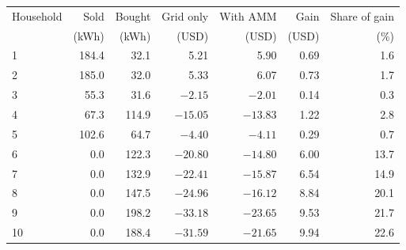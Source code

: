 \begin{tabular}{lrrrrrr}
\toprule
Household & Sold & Bought & Grid only & With AMM & Gain & Share of gain \\
 & (kWh) & (kWh) & (USD) & (USD) & (USD) & (\%) \\
\midrule
1 & 184.4 & 32.1 & 5.21 & 5.90 & 0.69 & 1.6 \\
2 & 185.0 & 32.0 & 5.33 & 6.07 & 0.73 & 1.7 \\
3 & 55.3 & 31.6 & $-2.15$ & $-2.01$ & 0.14 & 0.3 \\
4 & 67.3 & 114.9 & $-15.05$ & $-13.83$ & 1.22 & 2.8 \\
5 & 102.6 & 64.7 & $-4.40$ & $-4.11$ & 0.29 & 0.7 \\
6 & 0.0 & 122.3 & $-20.80$ & $-14.80$ & 6.00 & 13.7 \\
7 & 0.0 & 132.9 & $-22.41$ & $-15.87$ & 6.54 & 14.9 \\
8 & 0.0 & 147.5 & $-24.96$ & $-16.12$ & 8.84 & 20.1 \\
9 & 0.0 & 198.2 & $-33.18$ & $-23.65$ & 9.53 & 21.7 \\
10 & 0.0 & 188.4 & $-31.59$ & $-21.65$ & 9.94 & 22.6 \\
\bottomrule
\end{tabular}